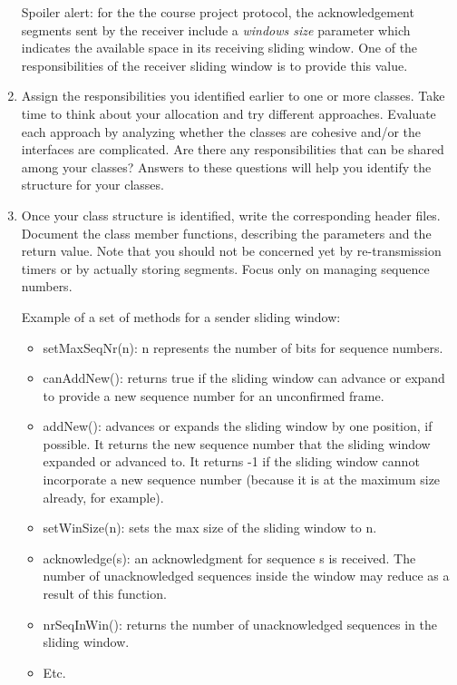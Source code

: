 \documentclass[12pt]{book}
\begin{document}
\begin{enumerate}[label=Activity \arabic*:, ref=\arabic*]
  Spoiler alert: for the the course project protocol, the acknowledgement segments sent by the receiver include a \emph{windows size} parameter which indicates the available space in its receiving sliding window. One of the responsibilities of the receiver sliding window is to provide this value.
  
\item Assign the responsibilities you identified earlier to one or more classes. Take time to think about your allocation and try different approaches. Evaluate each approach by analyzing whether the classes are cohesive and/or the interfaces are complicated. Are there any responsibilities that can be shared among your classes? Answers to these questions will help you identify the structure for your classes.

\item Once your class structure is identified, write the corresponding header files. Document the class member functions, describing the parameters and the return value. Note that you should not be concerned yet by re-transmission timers or by actually storing segments. Focus only on managing sequence numbers.

  Example of a set of methods for a sender sliding window:
  \begin{itemize}[label=--]
  \item setMaxSeqNr(n): n represents the number of bits for sequence numbers.
  \item canAddNew(): returns true if the sliding window can advance or expand to provide a new sequence number for an unconfirmed frame.
  \item addNew(): advances or expands the sliding window by one position, if possible. It returns the new sequence number that the sliding window expanded or advanced to. It returns -1 if the sliding window cannot incorporate a new sequence number (because it is at the maximum size already, for example).
  \item setWinSize(n): sets the max size of the sliding window to n.
  \item acknowledge(s): an acknowledgment for sequence s is received. The number of unacknowledged sequences inside the window may reduce as a result of this function.
  \item nrSeqInWin(): returns the number of unacknowledged sequences in the sliding window.
  \item Etc.
  \end{itemize}
\end{enumerate}
\end{document}
